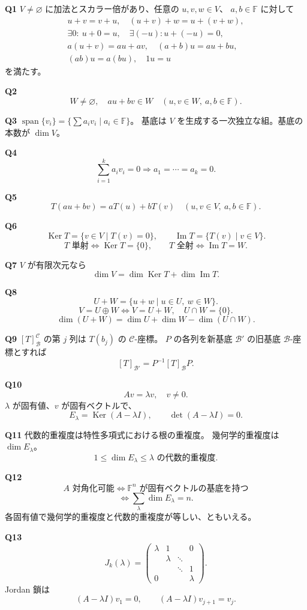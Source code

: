 \documentclass[uplatex,dvipdfmx,9pt]{jsarticle}
\newcommand{\F}{\mathbb F}
\newcommand{\Span}{\operatorname{span}}
\newcommand{\Img}{\operatorname{Im}}
\newcommand{\Ker}{\operatorname{Ker}}
\newcommand{\answer}[2]{%
  \par\noindent
  {\color{teal}\bfseries Q#1}\quad #2\par
  \vspace{1.5mm}
}
\newcommand{\must}[1]{\boxed{\displaystyle #1}}
\begin{document}
\begin{multicols}{2}
\answer{1}{
\(V\ne\varnothing\) に加法とスカラー倍があり、任意の \(u,v,w\in V\)、
\(a,b\in\F\) に対して
\[
\begin{gathered}
u+v=v+u,\quad (u+v)+w=u+(v+w),\\
\exists0:\ u+0=u,\quad \exists(-u):u+(-u)=0,\\
a(u+v)=au+av,\quad(a+b)u=au+bu,\\
(ab)u=a(bu),\quad1u=u
\end{gathered}
\]
を満たす。}

\answer{2}{
\[
\must{W\ne\varnothing,\quad
au+bv\in W\quad(u,v\in W,\ a,b\in\F)}.
\]}

\answer{3}{
\(\Span\{v_i\}=\{\sum a_iv_i\mid a_i\in\F\}\)。
基底は \(V\) を生成する一次独立な組。基底の本数が \(\dim V\)。}

\answer{4}{
\[
\must{\sum_{i=1}^ka_iv_i=0\Longrightarrow a_1=\cdots=a_k=0}.
\]}

\answer{5}{
\[
\must{T(au+bv)=aT(u)+bT(v)}
\quad(u,v\in V,\ a,b\in\F).
\]}

\answer{6}{
\[
\Ker T=\{v\in V\mid T(v)=0\},\qquad
\Img T=\{T(v)\mid v\in V\}.
\]
\[
T\text{ 単射}\iff\Ker T=\{0\},\qquad
T\text{ 全射}\iff\Img T=W.
\]}

\answer{7}{
\(V\) が有限次元なら
\[
\must{\dim V=\dim\Ker T+\dim\Img T}.
\]}

\answer{8}{
\[
U+W=\{u+w\mid u\in U,\ w\in W\}.
\]
\[
V=U\oplus W
\iff V=U+W,\quad U\cap W=\{0\}.
\]
\[
\dim(U+W)=\dim U+\dim W-\dim(U\cap W).
\]}

\answer{9}{
\([T]_{\mathcal B}^{\mathcal C}\) の第 \(j\) 列は
\(T(b_j)\) の \(\mathcal C\)-座標。
\(P\) の各列を新基底 \(\mathcal B'\) の旧基底 \(\mathcal B\)-座標とすれば
\[
\must{[T]_{\mathcal B'}=P^{-1}[T]_{\mathcal B}P}.
\]}

\columnbreak

\answer{10}{
\[
Av=\lambda v,\quad v\ne0.
\]
\(\lambda\) が固有値、\(v\) が固有ベクトルで、
\[
E_\lambda=\Ker(A-\lambda I),\qquad
\det(A-\lambda I)=0.
\]}

\answer{11}{
代数的重複度は特性多項式における根の重複度。
幾何学的重複度は \(\dim E_\lambda\)。
\[
\must{1\le\dim E_\lambda\le
\lambda\text{ の代数的重複度}}.
\]}

\answer{12}{
\[
\must{A\text{ 対角化可能}
\iff\F^n\text{ が固有ベクトルの基底を持つ}}
\]
\[
\iff\sum_\lambda\dim E_\lambda=n.
\]
各固有値で幾何学的重複度と代数的重複度が等しい、ともいえる。}

\answer{13}{
\[
J_k(\lambda)=
\begin{pmatrix}
\lambda&1&&0\\
&\lambda&\ddots&\\
&&\ddots&1\\
0&&&\lambda
\end{pmatrix}.
\]
Jordan 鎖は
\[
(A-\lambda I)v_1=0,\qquad
(A-\lambda I)v_{j+1}=v_j.
\]}


\end{multicols}
\end{document}
